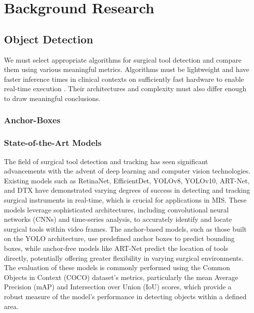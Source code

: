 \section{Background Research}

\subsection{Object Detection}

We must select appropriate algorithms for surgical tool detection and compare them using various meaningful metrics. Algorithms must be lightweight and have faster inference times in clinical contexts on sufficiently fast hardware to enable real-time execution \cite{ali2023comprehensivesurveyrecentdeep}. Their architectures and complexity must also differ enough to draw meaningful conclusions.

\subsubsection{Anchor-Boxes}



\subsubsection{State-of-the-Art Models}

The field of surgical tool detection and tracking has seen significant advancements with the advent of deep learning and computer vision technologies. Existing models such as RetinaNet, EfficientDet, YOLOv8, YOLOv10, ART-Net, and DTX have demonstrated varying degrees of success in detecting and tracking surgical instruments in real-time, which is crucial for applications in MIS. These models leverage sophisticated architectures, including convolutional neural networks (CNNs) and time-series analysis, to accurately identify and locate surgical tools within video frames. The anchor-based models, such as those built on the YOLO architecture, use predefined anchor boxes to predict bounding boxes, while anchor-free models like ART-Net predict the location of tools directly, potentially offering greater flexibility in varying surgical environments. The evaluation of these models is commonly performed using the Common Objects in Context (COCO) dataset's metrics, particularly the mean Average Precision (mAP) and Intersection over Union (IoU) scores, which provide a robust measure of the model's performance in detecting objects within a defined area. 

